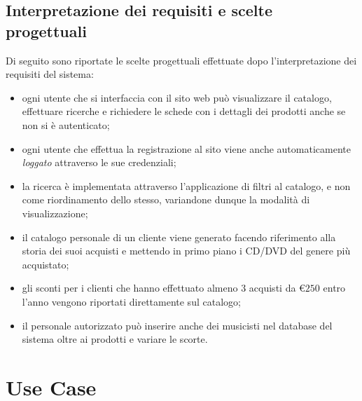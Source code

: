 \documentclass[a4paper,12pt]{report}
\begin{document}
	\section*{Interpretazione dei requisiti e scelte progettuali}
	Di seguito sono riportate le scelte progettuali effettuate dopo l'interpretazione dei requisiti del sistema:
	\begin{itemize}
		\item ogni utente che si interfaccia con il sito web può visualizzare il catalogo, effettuare ricerche e richiedere le schede con i dettagli dei prodotti anche se non si è autenticato;
		\item ogni utente che effettua la registrazione al sito viene anche automaticamente \textit{loggato} attraverso le sue credenziali;
		\item la ricerca è implementata attraverso l'applicazione di filtri al catalogo, e non come riordinamento dello stesso, variandone dunque la modalità di visualizzazione;
		\item il catalogo personale di un cliente viene generato facendo riferimento alla storia dei suoi acquisti e mettendo in primo piano i CD/DVD del genere più acquistato;
		\item gli sconti per i clienti che hanno effettuato almeno 3 acquisti da \euro{}$250$ entro l'anno vengono riportati direttamente sul catalogo;
		\item il personale autorizzato può inserire anche dei musicisti nel database del sistema oltre ai prodotti e variare le scorte.
	\end{itemize}
	
	
	
	\chapter*{Use Case}
\end{document}
